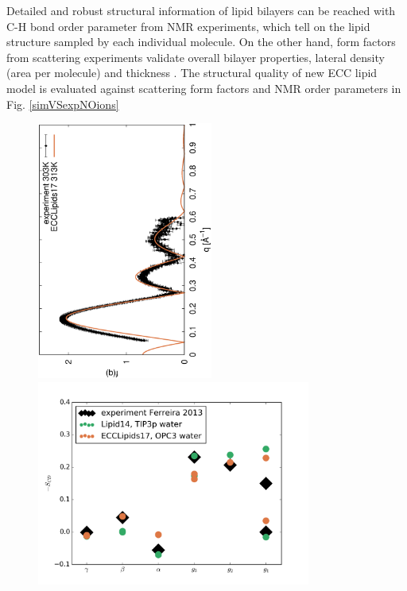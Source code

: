 \documentclass[aip,jcp,twocolumn]{revtex4}
\begin{document}
{Detailed and robust structural information of lipid bilayers can
be reached with C-H bond order parameter from NMR experiments,
which tell on the lipid structure sampled by each individual molecule.
On the other hand, form factors from scattering experiments validate overall bilayer properties, 
lateral density (area per molecule) and thickness \cite{ollila16}. 
The structural quality of
new ECC lipid model is evaluated against scattering form factors and NMR order parameters
in Fig. \ref{simVSexpNOions}
\begin{figure}[]
  \centering
  \includegraphics[height=8.5cm,angle=-90]{../Fig/form-f_exp-l14-eccl17.eps}
%
  \includegraphics[width=9.0cm]{../Fig/ipython_nb/Headgr_OPs_exp-L14-ECCL17.png}

\end{figure}}
\end{document}
